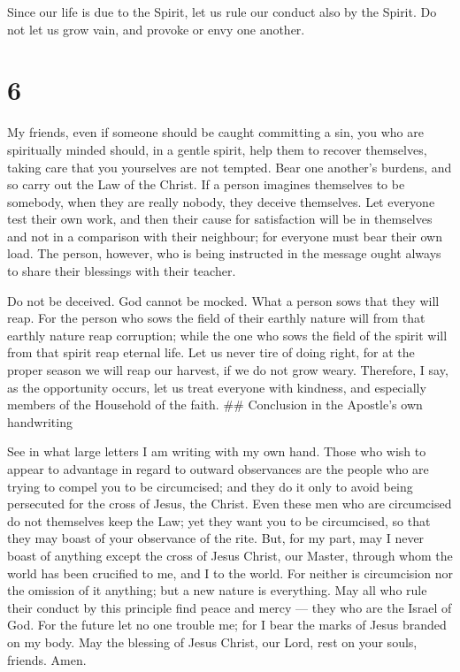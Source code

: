  Since our life is due to the Spirit, let us rule our
conduct also by the Spirit.  Do not let us grow vain, and
provoke or envy one another.

\hypertarget{section-5}{%
\section{6}\label{section-5}}

 My friends, even if someone should be caught committing a
sin, you who are spiritually minded should, in a gentle spirit, help
them to recover themselves, taking care that you yourselves are not
tempted.  Bear one another's burdens, and so carry out the
Law of the Christ.  If a person imagines themselves to be
somebody, when they are really nobody, they deceive themselves.
 Let everyone test their own work, and then their cause for
satisfaction will be in themselves and not in a comparison with their
neighbour;  for everyone must bear their own load.
 The person, however, who is being instructed in the message
ought always to share their blessings with their teacher.

 Do not be deceived. God cannot be mocked. What a person
sows that they will reap.  For the person who sows the field
of their earthly nature will from that earthly nature reap corruption;
while the one who sows the field of the spirit will from that spirit
reap eternal life.  Let us never tire of doing right, for at
the proper season we will reap our harvest, if we do not grow weary.
 Therefore, I say, as the opportunity occurs, let us treat
everyone with kindness, and especially members of the Household of the
faith. \#\# Conclusion in the Apostle's own handwriting

 See in what large letters I am writing with my own hand.
 Those who wish to appear to advantage in regard to outward
observances are the people who are trying to compel you to be
circumcised; and they do it only to avoid being persecuted for the cross
of Jesus, the Christ.  Even these men who are circumcised
do not themselves keep the Law; yet they want you to be circumcised, so
that they may boast of your observance of the rite.  But,
for my part, may I never boast of anything except the cross of Jesus
Christ, our Master, through whom the world has been crucified to me, and
I to the world.  For neither is circumcision nor the
omission of it anything; but a new nature is everything. 
May all who rule their conduct by this principle find peace and mercy
--- they who are the Israel of God.  For the future let no
one trouble me; for I bear the marks of Jesus branded on my body.
 May the blessing of Jesus Christ, our Lord, rest on your
souls, friends. Amen.
